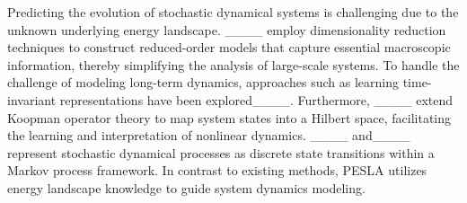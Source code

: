 Predicting the evolution of stochastic dynamical systems is challenging due to the unknown underlying energy landscape. ____ employ dimensionality reduction techniques to construct reduced-order models that capture essential macroscopic information, thereby simplifying the analysis of large-scale systems. To handle the challenge of modeling long-term dynamics, approaches such as learning time-invariant representations have been explored____. Furthermore, ____ extend Koopman operator theory to map system states into a Hilbert space, facilitating the learning and interpretation of nonlinear dynamics. ____ and____ represent stochastic dynamical processes as discrete state transitions within a Markov process framework. In contrast to existing methods, PESLA utilizes energy landscape knowledge to guide system dynamics modeling.